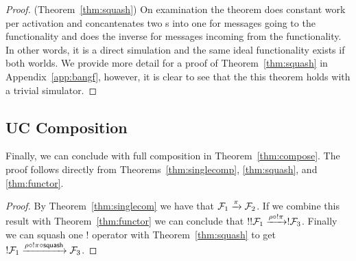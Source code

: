 \begin{proof} (Theorem~\ref{thm:squash})
On examination the  theorem does constant work per activation and concantenates two s into one for messages going to the functionality and does the inverse for messages incoming from the functionality.
In other words, it is a direct simulation and the same ideal functionality exists if both worlds.
We provide more detail for a proof of Theorem~\ref{thm:squash} in Appendix~\ref{app:bangf}, however, it is clear to see that the this theorem holds with a trivial simulator.
%
%
%
\end{proof}

\subsection{UC Composition}
Finally, we can conclude with full composition in Theorem~\ref{thm:compose}.
The proof follows directly from Theorems~\ref{thm:singlecomp}, \ref{thm:squash}, and \ref{thm:functor}.

\begin{proof}
By Theorem~\ref{thm:singlecom} we have that $\mathcal{F}_1 \xrightarrow{\pi} \mathcal{F}_2$. If we combine this result with Theorem~\ref{thm:functor} we can conclude that $!!\mathcal{F}_1 \xrightarrow{\rho \circ !\pi} !\mathcal{F}_3$. 
Finally we can squash one $!$ operator with Theorem~\ref{thm:squash} to get $!\mathcal{F}_1 \xrightarrow{\rho \circ !\pi \circ \mathsf{squash}} \mathcal{F}_3$.
\end{proof}


